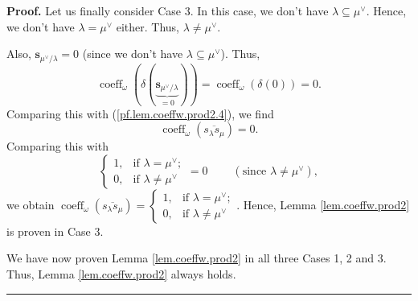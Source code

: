\documentclass[numbers=enddot,12pt,final,onecolumn,notitlepage]{scrartcl}%
\theoremstyle{definition}
\newenvironment{proof}[1][Proof]{\noindent\textbf{#1.} }{\ \rule{0.5em}{0.5em}}
\begin{document}
\begin{proof}
Let us finally consider Case 3. In this case, we don't have $\lambda
\subseteq\mu^{\vee}$. Hence, we don't have $\lambda=\mu^{\vee}$ either. Thus,
$\lambda\neq\mu^{\vee}$.

Also, $\mathbf{s}_{\mu^{\vee}/\lambda}=0$ (since we don't have $\lambda
\subseteq\mu^{\vee}$). Thus,%
\[
\operatorname*{coeff}\nolimits_{\omega}\left(  \delta\left(
\underbrace{\mathbf{s}_{\mu^{\vee}/\lambda}}_{=0}\right)  \right)
=\operatorname*{coeff}\nolimits_{\omega}\left(  \delta\left(  0\right)
\right)  =0.
\]
Comparing this with (\ref{pf.lem.coeffw.prod2.4}), we find%
\[
\operatorname*{coeff}\nolimits_{\omega}\left(  \overline{s_{\lambda}s_{\mu}%
}\right)  =0.
\]
Comparing this with%
\[%
\begin{cases}
1, & \text{if }\lambda=\mu^{\vee};\\
0, & \text{if }\lambda\neq\mu^{\vee}%
\end{cases}
=0\ \ \ \ \ \ \ \ \ \ \left(  \text{since }\lambda\neq\mu^{\vee}\right)  ,
\]
we obtain $\operatorname*{coeff}\nolimits_{\omega}\left(  \overline
{s_{\lambda}s_{\mu}}\right)  =%
\begin{cases}
1, & \text{if }\lambda=\mu^{\vee};\\
0, & \text{if }\lambda\neq\mu^{\vee}%
\end{cases}
$. Hence, Lemma \ref{lem.coeffw.prod2} is proven in Case 3.

We have now proven Lemma \ref{lem.coeffw.prod2} in all three Cases 1, 2 and 3.
Thus, Lemma \ref{lem.coeffw.prod2} always holds.
\end{proof}
\end{document}
